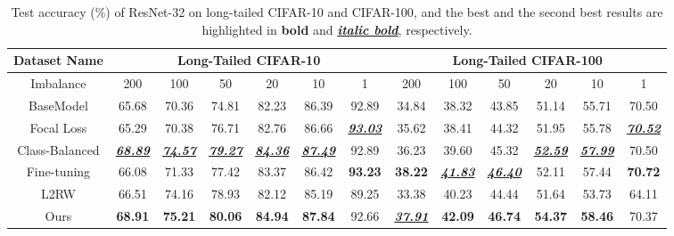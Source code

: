 \documentclass{article}
\begin{document}
	
	
	\begin{table}
		\caption{Test accuracy (\%) of ResNet-32 on long-tailed CIFAR-10 and CIFAR-100, and the best and the second best results are highlighted in \textbf{bold} and \textbf{\underline{\emph{ italic bold}}}, respectively.}\label{classim} \vspace{0mm}
		\centering
		\begin{scriptsize}
			\begin{tabular}{c|c|c|c|c|c|c|c|c|c|c|c|c}
				\toprule
				Dataset Name & \multicolumn{6}{c|}{Long-Tailed CIFAR-10} & \multicolumn{6}{c}{Long-Tailed CIFAR-100}\\
				\hline
				Imbalance & 200 & 100 & 50 & 20 & 10 &1& 200 & 100 & 50 & 20 & 10 &1 \\
				\hline
				BaseModel & 65.68& 70.36& 74.81& 82.23& 86.39& 92.89&34.84& 38.32&43.85&51.14& 55.71& 70.50\\
				Focal Loss& 65.29& 70.38& 76.71& 82.76& 86.66& \textbf{\underline{\emph{93.03}}} & 35.62& 38.41& 44.32&51.95& 55.78& \textbf{\underline{\emph{70.52}}}\\
				Class-Balanced &\textbf{\underline{\emph{68.89}}}& \textbf{\underline{\emph{74.57}}}& \textbf{\underline{\emph{79.27}}}& \textbf{\underline{\emph{84.36}}}& \textbf{\underline{\emph{87.49}}}& 92.89& 36.23& 39.60 & 45.32&     \textbf{\emph{\underline{ 52.59}}}& \textbf{\underline{\emph{57.99}}}& 70.50\\
				\hline
				\hline
				Fine-tuning&66.08&71.33&77.42&83.37&86.42&\textbf{93.23}&\textbf{38.22}&\textbf{\emph{\underline{41.83}}}&\emph{\textbf{\underline{46.40}}}&52.11&57.44&\textbf{70.72}\\
				L2RW&66.51 & 74.16&78.93 &82.12 &85.19 & 89.25& 33.38&40.23 &44.44 &51.64 & 53.73 & 64.11\\
				Ours&\textbf{68.91} &\textbf{75.21} &\textbf{80.06} & \textbf{84.94}&\textbf{87.84 }&92.66 &\emph{\textbf{\underline{37.91}}} & \textbf{42.09}&\textbf{46.74} &\textbf{54.37 }& \textbf{58.46} &70.37\\
				\bottomrule
			\end{tabular}
		\end{scriptsize} \vspace{0mm}
	\end{table}
	


	
	
	\vspace{0mm}
\end{document}
